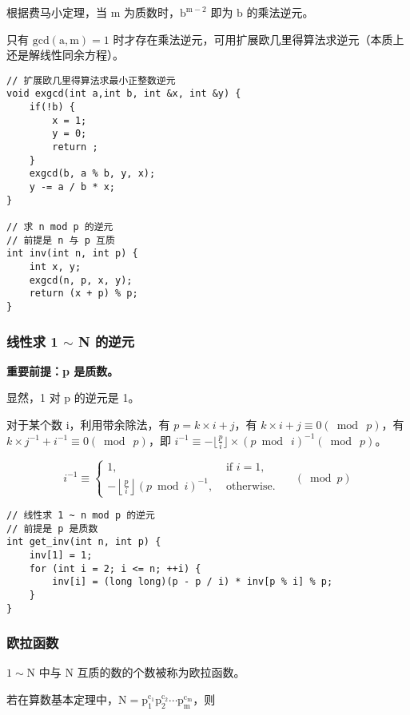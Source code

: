 \documentclass[UTF8]{article}
\begin{document}
根据费马小定理，当 $\mathrm{m}$ 为质数时，$\mathrm{b^{m - 2}}$ 即为 $\mathrm{b}$ 的乘法逆元。 

只有 $\mathrm{gcd(a,m) = 1}$ 时才存在乘法逆元，可用扩展欧几里得算法求逆元（本质上还是解线性同余方程）。
\begin{lstlisting}[caption=乘法逆元]
// 扩展欧几里得算法求最小正整数逆元
void exgcd(int a,int b, int &x, int &y) {
	if(!b) {
		x = 1;
		y = 0;
		return ;
	}
	exgcd(b, a % b, y, x);
	y -= a / b * x;
}

// 求 n mod p 的逆元
// 前提是 n 与 p 互质
int inv(int n, int p) {
	int x, y;
	exgcd(n, p, x, y);
	return (x + p) % p;
}
\end{lstlisting}


\subsubsection{线性求 1 $\sim$ N 的逆元}
\textbf{重要前提：p 是质数。}

显然，1 对 p 的逆元是 1。

对于某个数 i，利用带余除法，有 $p = k \times i + j$，有 $k \times i + j \equiv 0 (\bmod\ p)$，有  $k \times j ^ {-1} + i ^ {-1} \equiv 0 (\bmod\ p)$，即 $i ^ {-1} \equiv -\lfloor \frac{p}{i} \rfloor \times (p \bmod\ i)^{-1} (\bmod\ p)$。

$$
i^{-1} \equiv\left\{\begin{array}{ll}
1, & \text { if } i=1, \\
-\left\lfloor\frac{p}{i}\right\rfloor(p \bmod i)^{-1}, & \text { otherwise. }
\end{array} \quad(\bmod p)\right.
$$

\begin{lstlisting}[caption=线性求逆元]
// 线性求 1 ~ n mod p 的逆元
// 前提是 p 是质数
int get_inv(int n, int p) {
	inv[1] = 1;
	for (int i = 2; i <= n; ++i) {
 		inv[i] = (long long)(p - p / i) * inv[p % i] % p;
	}
}
\end{lstlisting}


\subsubsection{欧拉函数}
$\mathrm{1 \sim N}$ 中与 $\mathrm{N}$ 互质的数的个数被称为欧拉函数。

若在算数基本定理中，$\mathrm{N = p_1^{c_1}p_2^{c_2}\cdots p_m^{c_m}}$，则
\end{document}
